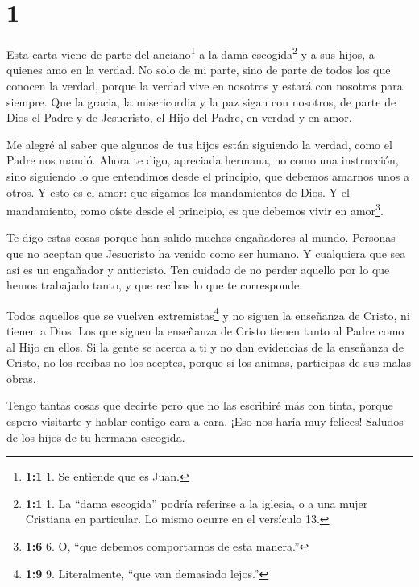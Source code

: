 \hypertarget{section}{%
\section{1}\label{section}}

 Esta carta viene de parte del anciano\footnote{\textbf{1:1}
  1. Se entiende que es Juan.} a la dama escogida\footnote{\textbf{1:1}
  1. La ``dama escogida'' podría referirse a la iglesia, o a una mujer
  Cristiana en particular. Lo mismo ocurre en el versículo 13.} y a sus
hijos, a quienes amo en la verdad. No solo de mi parte, sino de parte de
todos los que conocen la verdad,  porque la verdad vive en
nosotros y estará con nosotros para siempre.  Que la gracia,
la misericordia y la paz sigan con nosotros, de parte de Dios el Padre y
de Jesucristo, el Hijo del Padre, en verdad y en amor.

 Me alegré al saber que algunos de tus hijos están siguiendo
la verdad, como el Padre nos mandó.  Ahora te digo,
apreciada hermana, no como una instrucción, sino siguiendo lo que
entendimos desde el principio, que debemos amarnos unos a otros.
 Y esto es el amor: que sigamos los mandamientos de Dios. Y
el mandamiento, como oíste desde el principio, es que debemos vivir en
amor\footnote{\textbf{1:6} 6. O, ``que debemos comportarnos de esta
  manera.''}.

 Te digo estas cosas porque han salido muchos engañadores al
mundo. Personas que no aceptan que Jesucristo ha venido como ser humano.
Y cualquiera que sea así es un engañador y anticristo.  Ten
cuidado de no perder aquello por lo que hemos trabajado tanto, y que
recibas lo que te corresponde.

 Todos aquellos que se vuelven extremistas\footnote{\textbf{1:9}
  9. Literalmente, ``que van demasiado lejos.''} y no siguen la
enseñanza de Cristo, ni tienen a Dios. Los que siguen la enseñanza de
Cristo tienen tanto al Padre como al Hijo en ellos.  Si la
gente se acerca a ti y no dan evidencias de la enseñanza de Cristo, no
los recibas no los aceptes,  porque si los animas,
participas de sus malas obras.

 Tengo tantas cosas que decirte pero que no las escribiré
más con tinta, porque espero visitarte y hablar contigo cara a cara.
¡Eso nos haría muy felices!  Saludos de los hijos de tu
hermana escogida.

